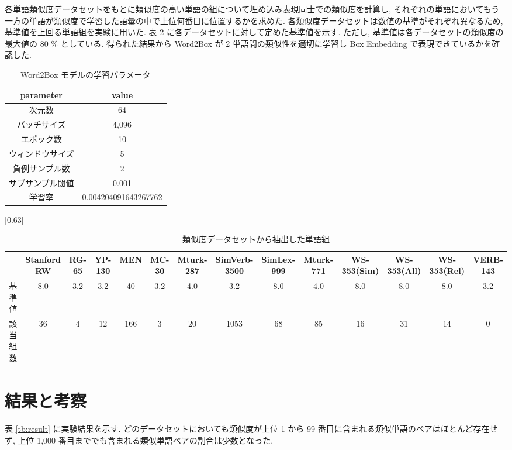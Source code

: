 \documentclass[twocolumn]{jarticle}     %
\begin{document}
各単語類似度データセットをもとに類似度の高い単語の組について埋め込み表現同士での類似度を計算し, それぞれの単語においてもう一方の単語が類似度で学習した語彙の中で上位何番目に位置するかを求めた. 
各類似度データセットは数値の基準がそれぞれ異なるため, 基準値を上回る単語組を実験に用いた. 
表 \ref{tb:dataset_detail} に各データセットに対して定めた基準値を示す. 
ただし, 基準値は各データセットの類似度の最大値の 80 \% としている. 
得られた結果から Word2Box が 2 単語間の類似性を適切に学習し Box Embedding で表現できているかを確認した. 

\begin{table}[t]
  \centering
  \caption{Word2Box モデルの学習パラメータ}
  \label{tb:model_parameter}
  \begin{tabular}{c|c} \hline
      parameter&value \\ \hline
      次元数&64 \\
      バッチサイズ&4,096 \\ 
      エポック数&10 \\
      ウィンドウサイズ&5 \\
      負例サンプル数&2 \\
      サブサンプル閾値&0.001 \\
      学習率&0.004204091643267762 \\
      \hline
  \end{tabular}
\end{table}

\begin{table}[t]
  \centering
  \caption{類似度データセットから抽出した単語組}
  \label{tb:dataset_detail}
  \scalebox{0.63}[0.63]{
		\begin{tabular}{c|ccccccccccccc}
			\hline
			
      & Stanford RW & RG-65 & YP-130 & MEN & MC-30 & Mturk-287 & SimVerb-3500 & SimLex-999 & Mturk-771 & WS-353(Sim) & WS-353(All) & WS-353(Rel) & VERB-143 \\ \hline
			基準値  & 8.0         & 3.2   & 3.2    & 40  & 3.2   & 4.0       & 3.2          & 8.0        & 4.0       & 8.0         & 8.0         & 8.0         & 3.2      \\
			該当組数 & 36          & 4     & 12     & 166 & 3     & 20        & 1053         & 68         & 85        & 16          & 31          & 14          & 0        \\ \hline
			\end{tabular}
  }
\end{table}

\section{結果と考察}
表 \ref{tb:result} に実験結果を示す. 
どのデータセットにおいても類似度が上位 1 から 99 番目に含まれる類似単語のペアはほとんど存在せず, 上位 1,000 番目まででも含まれる類似単語ペアの割合は少数となった. 
\end{document}
